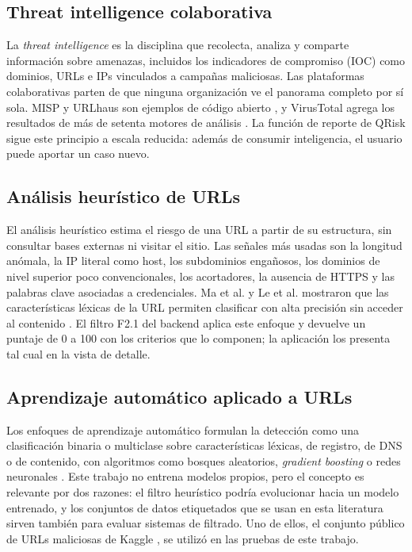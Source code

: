 \subsection{Threat intelligence colaborativa}

La \emph{threat intelligence} es la disciplina que recolecta, analiza y comparte información sobre amenazas, incluidos los indicadores de compromiso (IOC) como dominios, URLs e IPs vinculados a campañas maliciosas. Las plataformas colaborativas parten de que ninguna organización ve el panorama completo por sí sola. MISP y URLhaus son ejemplos de código abierto \cite{misp_project,urlhaus_api}, y VirusTotal agrega los resultados de más de setenta motores de análisis \cite{virustotal_apiv3}. La función de reporte de QRisk sigue este principio a escala reducida: además de consumir inteligencia, el usuario puede aportar un caso nuevo.

\subsection{Análisis heurístico de URLs}

El análisis heurístico estima el riesgo de una URL a partir de su estructura, sin consultar bases externas ni visitar el sitio. Las señales más usadas son la longitud anómala, la IP literal como host, los subdominios engañosos, los dominios de nivel superior poco convencionales, los acortadores, la ausencia de HTTPS y las palabras clave asociadas a credenciales. Ma et al. y Le et al. mostraron que las características léxicas de la URL permiten clasificar con alta precisión sin acceder al contenido \cite{ma2009beyond,le2011phishdef}. El filtro F2.1 del backend aplica este enfoque y devuelve un puntaje de 0 a 100 con los criterios que lo componen; la aplicación los presenta tal cual en la vista de detalle.

\subsection{Aprendizaje automático aplicado a URLs}

Los enfoques de aprendizaje automático formulan la detección como una clasificación binaria o multiclase sobre características léxicas, de registro, de DNS o de contenido, con algoritmos como bosques aleatorios, \emph{gradient boosting} o redes neuronales \cite{sahoo2017malicious,ma2009beyond}. Este trabajo no entrena modelos propios, pero el concepto es relevante por dos razones: el filtro heurístico podría evolucionar hacia un modelo entrenado, y los conjuntos de datos etiquetados que se usan en esta literatura sirven también para evaluar sistemas de filtrado. Uno de ellos, el conjunto público de URLs maliciosas de Kaggle \cite{kaggle_maliciousurls}, se utilizó en las pruebas de este trabajo.

